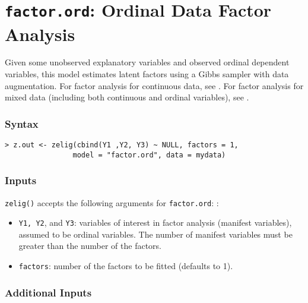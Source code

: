 \section{\texttt{factor.ord}: Ordinal Data Factor Analysis}
\label{factor.ord}

Given some unobserved explanatory variables and observed ordinal
dependent variables, this model estimates latent factors using a Gibbs
sampler with data augmentation.  For factor analysis for continuous
data, see .  For factor analysis for mixed data
(including both continuous and ordinal variables), see
.

\subsubsection{Syntax}
\begin{verbatim}
> z.out <- zelig(cbind(Y1 ,Y2, Y3) ~ NULL, factors = 1, 
                model = "factor.ord", data = mydata)
\end{verbatim}

\subsubsection{Inputs}
{\tt zelig()} accepts the following arguments for {\tt factor.ord}:  :
\begin{itemize}
\item \texttt{Y1, Y2}, and \texttt{Y3}: variables of interest in
factor analysis (manifest variables), assumed to be ordinal
variables. The number of manifest variables must be greater than the
number of the factors.

\item \texttt{factors}: number of the factors to be fitted (defaults
to 1).
\end{itemize}

\subsubsection{Additional Inputs}

